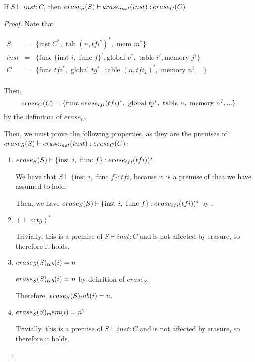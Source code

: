 \begin{lemma}{}
    If $S \vdash inst : C$, then $\erase[S]{S} \vdash \erase[inst]{inst} : \erase[C]{C}$
\end{lemma}
\begin{proof}
    Note that

    \begin{math}
        \begin{array}{rcl}
            S &=& \{\text{inst } C^{*}, \text{ tab } (n,tfi^{*})^{*}, \text{ mem } m^{*}\}\\
            inst &=& \{\text{func } \{\text{inst } i, \text{ func } f\}^{*}, \text{global } v^{*}, \text{ table } i^{?}, \text{memory } j^{?}\}\\
            C &=& \{\text{func } tfi^{*}, \text{ global } tg^{*}, \text{ table } (n,tfi_2)^{?}, \text{ memory } n^{?}, \dots\} \\
        \end{array}
    \end{math}

    Then, $$\erase[C]{C}=\{\text{func } \erase[tfi]{tfi}^{*}, \text{ global } tg^{*}, \text{ table } n, \text{ memory } n^{?}, ...\}$$ by the definition of $erase_C$.

    Then, we must prove the following properties, as they are the premises of $\erase[S]{S} \vdash \erase[inst]{inst} : \erase[C]{C}$:
    \begin{enumerate}
        \item $\erase[S]{S} \vdash \{\text{inst } i, \text{ func } f\} : \erase[tfi]{tfi})^{*}$

        We have that $S \vdash \{\text{inst } i, \text{ func } f\} : tfi$, because it is a premise of  that we have assumed to hold.

        Then, we have $\erase[S]{S} \vdash \{\text{inst } i, \text{ func } f\} : \erase[tfi]{tfi})^{*}$ by .

        \item $(\vdash v : tg)^{*}$

        Trivially, this is a premise of $S \vdash inst : C$ and is not affected by erasure, so therefore it holds.

        \item $\erase[S]{S}_{tab}(i)=n$

        $\erase[S]{S}_{tab}(i)=n$ by definition of $erase_S$.

        Therefore, $\erase[S]{S}_tab(i)=n$.

        \item $\erase[S]{S}_mem(i)=n^{?}$

        Trivially, this is a premise of $S \vdash inst : C$ and is not affected by erasure, so therefore it holds.
    \end{enumerate}
\end{proof}

